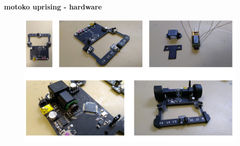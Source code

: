 \documentclass[xcolor=dvipsnames]{beamer}
\begin{document}
\begin{frame}{\bf motoko uprising - hardware}

  \begin{figure}
    \includegraphics[scale=0.4]{../images/robot_mount_01.jpg}
  \end{figure}

\end{frame}
\end{document}
